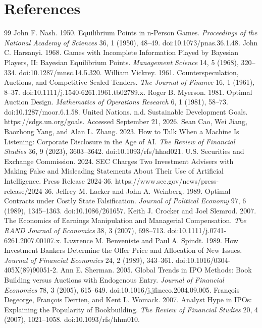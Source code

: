 \clearpage
\section*{References}
\begin{thebibliography}{99}
 John F. Nash. 1950. Equilibrium Points in n-Person Games. \emph{Proceedings of the National Academy of Sciences} 36, 1 (1950), 48--49. doi:10.1073/pnas.36.1.48.
 John C. Harsanyi. 1968. Games with Incomplete Information Played by Bayesian Players, II: Bayesian Equilibrium Points. \emph{Management Science} 14, 5 (1968), 320--334. doi:10.1287/mnsc.14.5.320.
 William Vickrey. 1961. Counterspeculation, Auctions, and Competitive Sealed Tenders. \emph{The Journal of Finance} 16, 1 (1961), 8--37. doi:10.1111/j.1540-6261.1961.tb02789.x.
 Roger B. Myerson. 1981. Optimal Auction Design. \emph{Mathematics of Operations Research} 6, 1 (1981), 58--73. doi:10.1287/moor.6.1.58.
 United Nations. n.d. Sustainable Development Goals. https://sdgs.un.org/goals. Accessed September 21, 2026.
 Sean Cao, Wei Jiang, Baozhong Yang, and Alan L. Zhang. 2023. How to Talk When a Machine Is Listening: Corporate Disclosure in the Age of AI. \emph{The Review of Financial Studies} 36, 9 (2023), 3603--3642. doi:10.1093/rfs/hhad021.
 U.S. Securities and Exchange Commission. 2024. SEC Charges Two Investment Advisers with Making False and Misleading Statements About Their Use of Artificial Intelligence. Press Release 2024-36. https://www.sec.gov/news/press-release/2024-36.
 Jeffrey M. Lacker and John A. Weinberg. 1989. Optimal Contracts under Costly State Falsification. \emph{Journal of Political Economy} 97, 6 (1989), 1345--1363. doi:10.1086/261657.
 Keith J. Crocker and Joel Slemrod. 2007. The Economics of Earnings Manipulation and Managerial Compensation. \emph{The RAND Journal of Economics} 38, 3 (2007), 698--713. doi:10.1111/j.0741-6261.2007.00107.x.
 Lawrence M. Benveniste and Paul A. Spindt. 1989. How Investment Bankers Determine the Offer Price and Allocation of New Issues. \emph{Journal of Financial Economics} 24, 2 (1989), 343--361. doi:10.1016/0304-405X(89)90051-2.
 Ann E. Sherman. 2005. Global Trends in IPO Methods: Book Building versus Auctions with Endogenous Entry. \emph{Journal of Financial Economics} 78, 3 (2005), 615--649. doi:10.1016/j.jfineco.2004.09.005.
 François Degeorge, François Derrien, and Kent L. Womack. 2007. Analyst Hype in IPOs: Explaining the Popularity of Bookbuilding. \emph{The Review of Financial Studies} 20, 4 (2007), 1021--1058. doi:10.1093/rfs/hhm010.

\end{thebibliography}
